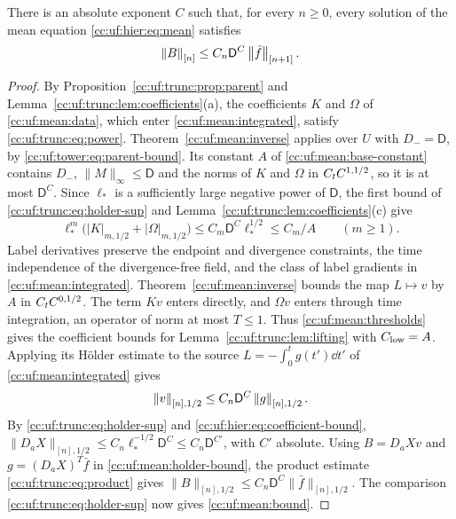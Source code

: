 \begin{proposition}\label{cc:uf:mean:columns}
There is an absolute exponent $C$ such that, for every $n\ge0$, every
solution of the mean equation \eqref{cc:uf:hier:eq:mean} satisfies
\begin{equation}\label{cc:uf:mean:bound}
 \left\lVert B\right\rVert_{[n]}\le C_n\mathsf D^C\left\lVert\bar f\right\rVert_{[n+1]}.
\end{equation}
\end{proposition}
\begin{proof}
By Proposition~\ref{cc:uf:trunc:prop:parent} and
Lemma~\ref{cc:uf:trunc:lem:coefficients}(a), the coefficients $K$ and
$\Omega$ of \eqref{cc:uf:mean:data}, which enter
\eqref{cc:uf:mean:integrated}, satisfy \eqref{cc:uf:trunc:eq:power}.
Theorem~\ref{cc:uf:mean:inverse} applies over $U$ with $D_-=\mathsf D$,
by \eqref{cc:uf:tower:eq:parent-bound}. Its constant $A$ of
\eqref{cc:uf:mean:base-constant} contains $D_-$,
$\|M\|_\infty\le\mathsf D$ and the norms of $K$ and $\Omega$ in
$C_tC^{1,1/2}$, so it is at most $\mathsf D^C$. Since $\ell_*$ is a
sufficiently large negative power of $\mathsf D$, the first bound of
\eqref{cc:uf:trunc:eq:holder-sup} and
Lemma~\ref{cc:uf:trunc:lem:coefficients}(c) give
\begin{equation}\label{cc:uf:mean:thresholds}
 \ell_*^m\bigl(|K|_{m,1/2}+|\Omega|_{m,1/2}\bigr)
 \le C_m\mathsf D^C\ell_*^{1/2}\le C_m/A\qquad(m\ge1).
\end{equation}
Label derivatives preserve the endpoint and divergence constraints,
the time independence of the divergence-free field, and the class of
label gradients in \eqref{cc:uf:mean:integrated}. Theorem~\ref{cc:uf:mean:inverse}
bounds the map $L\mapsto v$ by $A$ in $C_tC^{0,1/2}$. The term $Kv$
enters directly, and $\Omega v$ enters through time integration,
an operator of norm at most $T\le1$.
Thus \eqref{cc:uf:mean:thresholds} gives the coefficient bounds for
Lemma~\ref{cc:uf:trunc:lem:lifting} with $C_{\rm low}=A$.
Applying its H\"older estimate to the source $L=-\int_0^tg(t')\dd t'$
of \eqref{cc:uf:mean:integrated} gives
\begin{equation}\label{cc:uf:mean:holder-bound}
 \left\lVert v\right\rVert_{[n],1/2}\le C_n\mathsf D^C\left\lVert g\right\rVert_{[n],1/2}.
\end{equation}
By \eqref{cc:uf:trunc:eq:holder-sup} and \eqref{cc:uf:hier:eq:coefficient-bound},
$\|D_aX\|_{[n],1/2}\le C_n\ell_*^{-1/2}\mathsf D^C\le C_n\mathsf D^{C'}$,
with $C'$ absolute. Using $B=D_aXv$ and $g=(D_aX)^T\bar f$ in
\eqref{cc:uf:mean:holder-bound}, the product estimate \eqref{cc:uf:trunc:eq:product}
gives $\|B\|_{[n],1/2}\le C_n\mathsf D^C\|\bar f\|_{[n],1/2}$.
The comparison \eqref{cc:uf:trunc:eq:holder-sup} now gives \eqref{cc:uf:mean:bound}.
\end{proof}
